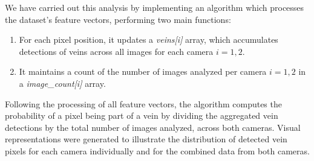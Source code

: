 We have carried out this analysis by implementing an algorithm which processes the dataset's feature vectors, performing two main functions:
\begin{enumerate}
    \item For each pixel position, it updates a \textit{veins[i]} array, which accumulates detections of veins across all images for each camera \(i={1,2}\).
    \item It maintains a count of the number of images analyzed per camera \(i={1,2}\) in a \textit{image\_count[i]} array.
\end{enumerate}

Following the processing of all feature vectors, the algorithm computes the probability of a pixel being part of a vein by dividing the aggregated vein detections by the total number of images analyzed, across both cameras. Visual representations were generated to illustrate the distribution of detected vein pixels for each camera individually and for the combined data from both cameras.
\newpage
